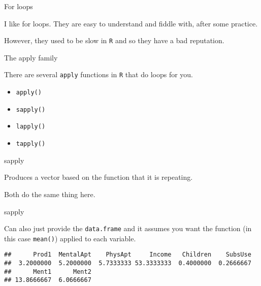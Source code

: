 \begin{frame}[fragile]{For loops}

I like for loops. They are easy to understand and fiddle with, after
some practice.

However, they used to be slow in \texttt{R} and so they have a bad
reputation.

\end{frame}

\begin{frame}[fragile]{The apply family}

There are several \texttt{apply} functions in \texttt{R} that do loops
for you.

\begin{itemize}
\tightlist
\item
  \texttt{apply()}
\item
  \texttt{sapply()}
\item
  \texttt{lapply()}
\item
  \texttt{tapply()}
\end{itemize}

\end{frame}

\begin{frame}[fragile]{sapply}

Produces a vector based on the function that it is repeating.

Both do the same thing here.

\begin{Shaded}
\begin{Highlighting}[]
 \OperatorTok{:}\NormalTok{)\{}
\NormalTok{\}}
\NormalTok{(}\OperatorTok{:}\NormalTok{, }
\end{Highlighting}
\end{Shaded}

\end{frame}

\begin{frame}[fragile]{sapply}

Can also just provide the \texttt{data.frame} and it assumes you want
the function (in this case \texttt{mean()}) applied to each variable.

\begin{Shaded}
\begin{Highlighting}[]
\end{Highlighting}
\end{Shaded}

\begin{verbatim}
##      Prod1  MentalApt    PhysApt     Income   Children    SubsUse 
##  3.2000000  5.2000000  5.7333333 53.3333333  0.4000000  0.2666667 
##      Ment1      Ment2 
## 13.8666667  6.0666667
\end{verbatim}

\end{frame}

